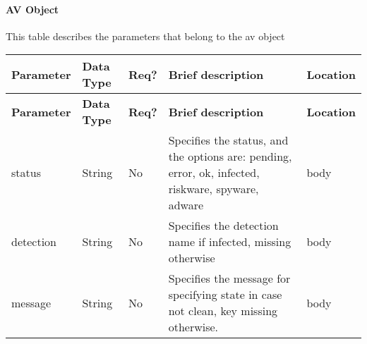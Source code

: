 
\paragraph*{AV Object}

This table describes the parameters that belong to the av object

{\footnotesize{}}%
\begin{longtable}{|>{\raggedright}p{}|>{\raggedright}p{}|>{\raggedright}p{}|>{\raggedright}p{}|>{\raggedright}p{}|}
\hline
\hline 
\textbf{\footnotesize{Parameter }} & \textbf{\footnotesize{Data Type}} & \textbf{\footnotesize{Req?}} & \textbf{\footnotesize{Brief description}} & \textbf{\footnotesize{Location}}\tabularnewline
\hline 
\hline
\endfirsthead
\hline
\hline 
\textbf{\footnotesize{Parameter }} & \textbf{\footnotesize{Data Type}} & \textbf{\footnotesize{Req?}} & \textbf{\footnotesize{Brief description}} & \textbf{\footnotesize{Location}}\tabularnewline
\hline 
\hline
\endhead
\hline 
{\footnotesize{status}} & {\footnotesize{String }} & {\footnotesize{No}} & {\footnotesize{Specifies the status, and the options are: pending,
error, ok, infected, riskware, spyware, adware}} & {\footnotesize{body}}\tabularnewline
\hline 
{\footnotesize{detection}} & {\footnotesize{String}} & {\footnotesize{No}} & {\footnotesize{Specifies the detection name if infected, missing otherwise}} & {\footnotesize{body}}\tabularnewline
\hline 
{\footnotesize{message}} & {\footnotesize{String}} & {\footnotesize{No}} & {\footnotesize{Specifies the message for specifying state in case
not clean, key missing otherwise.}} & {\footnotesize{body}}\tabularnewline
\hline 
\end{longtable}{\footnotesize \par}

{\footnotesize{}}
